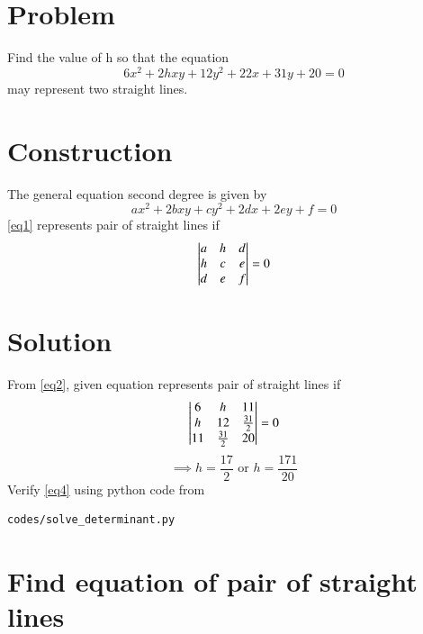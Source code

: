 \documentclass[journal,12pt,twocolumn]{IEEEtran}
\begin{document}
\section{Problem}
Find the value of h so that the equation
\begin{equation}\nonumber
	6x^2 + 2hxy + 12y^2 + 22x + 31y + 20 = 0
\end{equation}
may represent two straight lines.
\section{Construction}
The general equation second degree is given by
\begin{equation}\label{eq1}
	ax^2 + 2bxy + cy^2 + 2dx + 2ey + f = 0
\end{equation}
\eqref{eq1} represents pair of straight lines if
\begin{equation}\label{eq2}
	\begin{vmatrix} a & h & d\\
			h & c & e\\
			d & e & f\end{vmatrix} = 0
\end{equation}
\section{Solution}
From \eqref{eq2}, given equation represents pair of straight lines if 
\begin{equation}\label{eq3}
	\begin{vmatrix} 6 & h & 11\\
			h & 12 & \frac{31}{2}\\
			11 & \frac{31}{2} & 20\end{vmatrix} = 0
\end{equation}
\begin{equation}\label{eq4}
	\implies h = \frac{17}{2} \text{ or } h = \frac{171}{20}
\end{equation}
Verify  \eqref{eq4} using python code from
\begin{lstlisting}
codes/solve_determinant.py
\end{lstlisting}
\section{Find equation of pair of straight lines}
\end{document}

